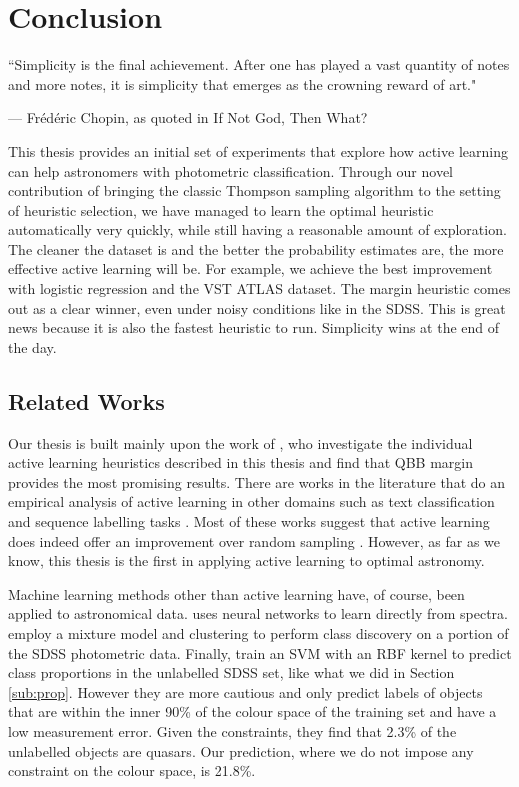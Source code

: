 
\chapter{Conclusion}
\label{cha:conclusion}


\epigraph{``Simplicity is the final achievement. After one has played a vast quantity of notes and more notes, it is simplicity that emerges as the crowning reward of art."}{--- \textup{Fr\'ed\'eric Chopin, as quoted in} If Not God, Then What?}


This thesis provides an initial set of experiments that explore how active learning can help
astronomers with photometric classification. Through our novel contribution of bringing the classic
Thompson sampling algorithm to the setting of heuristic selection, we have managed to learn the
optimal heuristic automatically very quickly, while still having a reasonable amount of exploration.
The cleaner the dataset is and the better the probability estimates are, the more effective active
learning will be. For example, we achieve the best improvement with logistic regression and the VST
ATLAS dataset. The margin heuristic comes out as a clear winner, even under noisy conditions like
in the SDSS. This is great news because it is also the fastest heuristic to run. Simplicity
wins at the end of the day.


\section{Related Works}
\label{sec:related}

Our thesis is built mainly upon the work of , who investigate the individual active
learning heuristics described in this thesis and find that QBB margin provides the most promising
results. There are works in the literature that do an empirical analysis of active
learning in other domains such as text classification \cite{tong02} and sequence labelling tasks
\cite{settles08}. Most of these works suggest that active learning does indeed offer an improvement
over random sampling . However, as far as we know, this thesis is the first in applying
active learning to optimal astronomy.

Machine learning methods other than active learning have, of course, been applied to astronomical
data.  uses neural networks to learn directly from spectra. 
employ a mixture model and clustering to perform class discovery on a portion of the SDSS
photometric data. Finally,  train an SVM with an RBF kernel to predict class
proportions in the unlabelled SDSS set, like what we did in Section \ref{sub:prop}. However they
are more cautious and only predict labels of objects that are within the inner 90\% of the
colour space of the training set and have a low measurement error. Given the constraints, they
find that 2.3\% of the unlabelled objects are quasars. Our prediction, where we do not
impose any constraint on the colour space, is 21.8\%.


